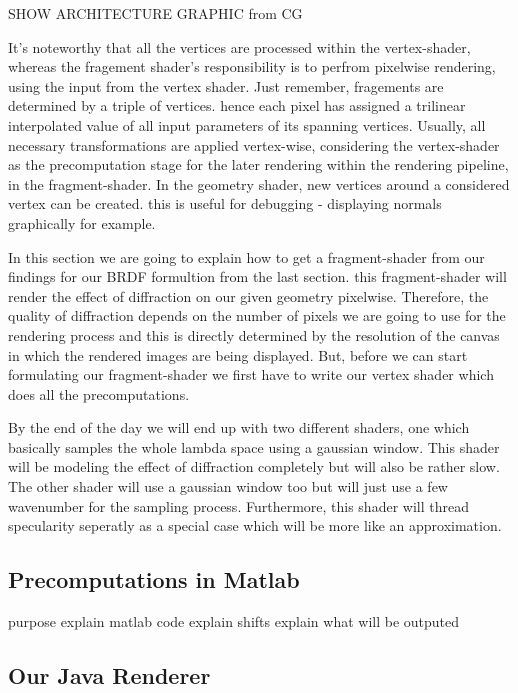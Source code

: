 SHOW ARCHITECTURE GRAPHIC from CG


It's noteworthy that all the vertices are processed within the vertex-shader, whereas the fragement shader's responsibility is to perfrom pixelwise rendering, using the input from the vertex shader. Just remember, fragements are determined by a triple of vertices. hence each pixel has assigned a trilinear interpolated value of all input parameters of its spanning vertices.
Usually, all necessary transformations are applied vertex-wise, considering the vertex-shader as the precomputation stage for the later rendering within the rendering pipeline, in the fragment-shader. In the geometry shader, new vertices around a considered vertex can be created. this is useful for debugging - displaying normals graphically for example.

In this section we are going to explain how to get a fragment-shader from our findings for our BRDF formultion from the last section.  this fragment-shader will render the effect of diffraction on our given geometry pixelwise. Therefore, the quality of diffraction depends on the number of pixels we are going to use for the rendering process and this is directly determined by the resolution of the canvas in which the rendered images are being displayed. 
But, before we can start formulating our fragment-shader we first have to write our vertex shader which does all the precomputations. 
 
By the end of the day we will end up with two different shaders, one which basically samples the whole lambda space using a gaussian window. This shader will be modeling the effect of diffraction completely but will also be rather slow. The other shader will use a gaussian window too but will just use a few wavenumber for the sampling process. Furthermore, this shader will thread specularity seperatly as a special case which will be more like an approximation. 








\subsection{Precomputations in Matlab}
purpose
explain matlab code
explain shifts
explain what will be outputed

\subsection{Our Java Renderer}
